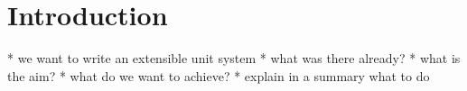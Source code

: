 \section{Introduction}





* we want to write an extensible unit system
* what was there already?
* what is the aim?
* what do we want to achieve?
* explain in a summary what to do
